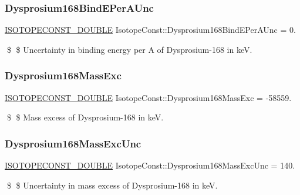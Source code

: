\subsubsection{\texorpdfstring{Dysprosium168\+Bind\+E\+Per\+A\+Unc}{Dysprosium168BindEPerAUnc}}
{\footnotesize\ttfamily \mbox{\hyperlink{group___isotope_const-_macros_ga8f45a7272ce02c0b4c65c44636ed719a}{I\+S\+O\+T\+O\+P\+E\+C\+O\+N\+S\+T\+\_\+\+D\+O\+U\+B\+LE}} Isotope\+Const\+::\+Dysprosium168\+Bind\+E\+Per\+A\+Unc = 0.}

\$ \$ Uncertainty in binding energy per A of Dysprosium-\/168 in keV. \mbox{\label{group___isotope_const-_dysprosium-_dy168_ga162c658ab993185788f44ab0759f699f}} 
\subsubsection{\texorpdfstring{Dysprosium168\+Mass\+Exc}{Dysprosium168MassExc}}
{\footnotesize\ttfamily \mbox{\hyperlink{group___isotope_const-_macros_ga8f45a7272ce02c0b4c65c44636ed719a}{I\+S\+O\+T\+O\+P\+E\+C\+O\+N\+S\+T\+\_\+\+D\+O\+U\+B\+LE}} Isotope\+Const\+::\+Dysprosium168\+Mass\+Exc = -\/58559.}

\$ \$ Mass excess of Dysprosium-\/168 in keV. \mbox{\label{group___isotope_const-_dysprosium-_dy168_ga236f5d57745bd419569b9eb3ea3b39ae}} 
\subsubsection{\texorpdfstring{Dysprosium168\+Mass\+Exc\+Unc}{Dysprosium168MassExcUnc}}
{\footnotesize\ttfamily \mbox{\hyperlink{group___isotope_const-_macros_ga8f45a7272ce02c0b4c65c44636ed719a}{I\+S\+O\+T\+O\+P\+E\+C\+O\+N\+S\+T\+\_\+\+D\+O\+U\+B\+LE}} Isotope\+Const\+::\+Dysprosium168\+Mass\+Exc\+Unc = 140.}

\$ \$ Uncertainty in mass excess of Dysprosium-\/168 in keV. \mbox{\label{group___isotope_const-_dysprosium-_dy168_gaf74262f61688d4d9e6fd12239db63aee}} 
